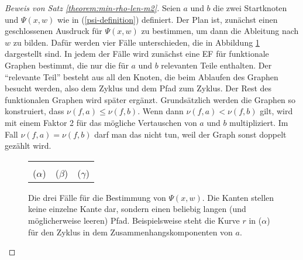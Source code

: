 \documentclass[a4paper, 10pt, ngerman]{article}
\begin{document}
    \begin{proof}[Beweis von Satz \ref{theorem:min-rho-len-m2}]
        Seien $a$ und $b$ die zwei Startknoten und $\Psi(x, w)$ wie in (\ref{psi-definition}) definiert. Der Plan ist, zunächst einen geschlossenen Ausdruck für $\Psi(x, w)$ zu bestimmen, um dann die Ableitung nach $w$ zu bilden. Dafür werden vier Fälle unterschieden, die in Abbildung \ref{fig:psi-construction} dargestellt sind. In jedem der Fälle wird zunächst eine EF für funktionale Graphen bestimmt, die nur die für $a$ und $b$ relevanten Teile enthalten. Der "`relevante Teil"' besteht aus all den Knoten, die beim Ablaufen des Graphen besucht werden, also dem Zyklus und dem Pfad zum Zyklus. Der Rest des funktionalen Graphen wird später ergänzt. Grundsätzlich werden die Graphen so konstruiert, dass $\nu(f, a) \le \nu(f, b)$. Wenn dann $\nu(f, a) < \nu(f, b)$ gilt, wird mit einem Faktor 2 für das mögliche Vertauschen von $a$ und $b$ multipliziert. Im Fall $\nu(f, a) = \nu(f, b)$ darf man das nicht tun, weil der Graph sonst doppelt gezählt wird.

        \begin{figure}
            \begin{tabular}{ccc}
                 &  &  \\
                ($\alpha$)                           & ($\beta$)                           & ($\gamma$)
            \end{tabular}
            \caption{Die drei Fälle für die Bestimmung von $\Psi(x, w)$. Die Kanten stellen keine einzelne Kante dar, sondern einen beliebig langen (und möglicherweise leeren) Pfad. Beispielsweise steht die Kurve $r$ in ($\alpha$) für den Zyklus in dem Zusammenhangskomponenten von $a$.}
            \label{fig:psi-construction}
        \end{figure}


\end{proof}
\end{document}
